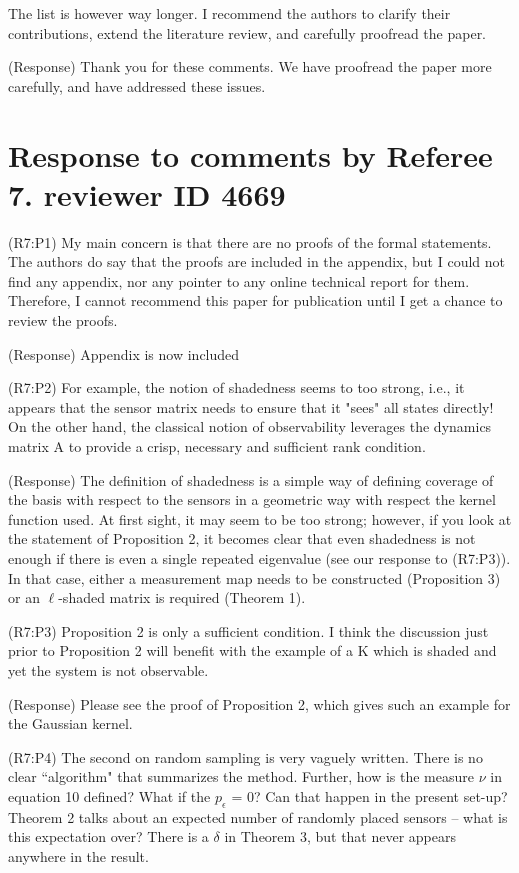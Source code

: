 \documentclass{letter}
\begin{document}
The list is however way longer. I recommend the authors to clarify
their contributions, extend the literature review, and carefully
proofread the paper. 

{\color{red}(Response)} Thank you for these comments. We have proofread the paper more carefully, and have addressed these issues. 

\section{Response to comments by Referee 7. reviewer ID 4669}

{\color{red}(R7:P1)} My main concern is that there are no proofs of the formal
statements. The authors do say that the proofs are included in the
appendix, but I could not find any appendix, nor any pointer to any
online technical report for them. Therefore, I cannot recommend this
paper for publication until I get a chance to review the proofs.

{\color{red}(Response)} Appendix is now included

{\color{red}(R7:P2)} For example, the notion of shadedness seems to too strong, i.e., it appears
that the sensor matrix needs to ensure that it "sees" all states
directly! On the other hand, the classical notion of observability
leverages the dynamics matrix A to provide a crisp, necessary and
sufficient rank condition. 

{\color{red}(Response)} The definition of shadedness is a simple way of defining coverage of the basis with respect to the sensors in a geometric way with respect the kernel function used. At first sight, it may seem to be too strong; however, if you look at the statement of Proposition 2, it becomes clear that even shadedness is not enough if there is even a single repeated eigenvalue (see our response to {\color{red}(R7:P3)}). In that case, either a measurement map needs to be constructed (Proposition 3) or an $\ell$-shaded matrix is required (Theorem 1). 


{\color{red}(R7:P3)} Proposition 2 is only a sufficient condition. I think the discussion
just prior to Proposition 2 will benefit with the example of a K which
is shaded and yet the system is not observable. 

{\color{red}(Response)} Please see the proof of Proposition 2, which gives such an example for the Gaussian kernel. 


{\color{red}(R7:P4)} The second on random sampling is very vaguely written. There is no
clear ``algorithm" that summarizes the method. Further, how is the
measure $ \nu $ in equation 10 defined? What if the $ p_\epsilon $ = 0? Can
that happen in the present set-up? Theorem 2 talks about an expected
number of randomly placed sensors -- what is this expectation over? There is a $ \delta $ in Theorem 3, but that never appears anywhere in the result. 
\end{document}

